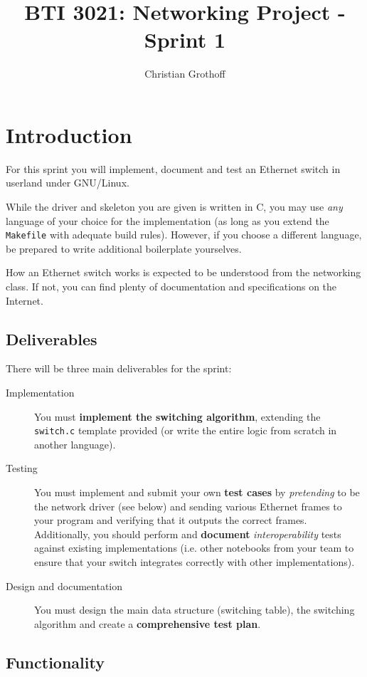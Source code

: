 \documentclass{article}
\title{BTI 3021: Networking Project - Sprint 1}
\author{Christian Grothoff}
\date{}
\begin{document}
\maketitle

\section{Introduction}

For this sprint you will implement, document and test an Ethernet
switch in userland under GNU/Linux.

While the driver and skeleton you are given is written in C, you may
use {\em any} language of your choice for the implementation (as long
as you extend the {\tt Makefile} with adequate build rules).  However,
if you choose a different language, be prepared to write additional
boilerplate yourselves.

How an Ethernet switch works is expected to be understood from the
networking class. If not, you can find plenty of documentation and
specifications on the Internet.


\subsection{Deliverables}

There will be three main deliverables for the sprint:
\begin{description}
\item[Implementation] You must {\bf implement the switching
  algorithm}, extending the {\tt switch.c} template provided
  (or write the entire logic from scratch in another language).
\item[Testing] You must implement and submit your own {\bf test cases}
  by {\em pretending} to be the network driver (see below) and sending
  various Ethernet frames to your program and verifying that it
  outputs the correct frames. Additionally, you should perform and
  {\bf document} {\em interoperability} tests against existing
  implementations (i.e. other notebooks from your team to ensure that
  your switch integrates correctly with other implementations).
\item[Design and documentation] You must design the main
  data structure (switching table), the switching algorithm
  and create a {\bf comprehensive test plan}.
\end{description}


\subsection{Functionality}
\end{document}
